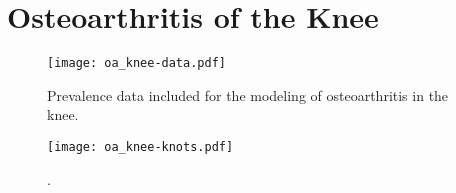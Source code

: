 \chapter{Osteoarthritis of the Knee}
\label{applications-con_fit_splines}

    \begin{figure}[h]
        \begin{center}
            \texttt{[image: oa\_knee-data.pdf]}
            \caption{Prevalence data included for the modeling of osteoarthritis in the knee.}
            \label{fig:app-oa knee data}
        \end{center}
    \end{figure}
    
        \begin{figure}[h]
        \begin{center}
            \texttt{[image: oa\_knee-knots.pdf]}
            \caption{.}
            \label{fig:app-oa knee knots}
        \end{center}
    \end{figure}